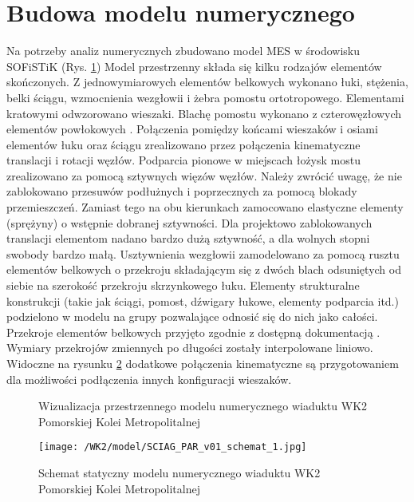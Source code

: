 \section{Budowa modelu numerycznego} \label{sect:wk2_basic_num_model}

Na potrzeby analiz numerycznych zbudowano model MES w środowisku SOFiSTiK (Rys. \ref{fig: model_wk2_visualization}) Model przestrzenny składa się kilku rodzajów elementów skończonych. Z jednowymiarowych elementów belkowych wykonano łuki, stężenia, belki ściągu, wzmocnienia wezgłowii i żebra pomostu ortotropowego. Elementami kratowymi odwzorowano wieszaki. Blachę pomostu wykonano z czterowęzłowych elementów powłokowych \parencite{SOFiSTiK2018}. Połączenia pomiędzy końcami wieszaków i osiami elementów łuku oraz ściągu zrealizowano przez połączenia kinematyczne translacji i rotacji węzłów. Podparcia pionowe w miejscach łożysk mostu zrealizowano za pomocą sztywnych więzów węzłów. Należy zwrócić uwagę, że nie zablokowano przesuwów podłużnych i poprzecznych za pomocą blokady przemieszczeń. Zamiast tego na obu kierunkach zamocowano elastyczne elementy (sprężyny) o wstępnie dobranej sztywności. Dla projektowo zablokowanych translacji elementom nadano bardzo dużą sztywność, a dla wolnych stopni swobody bardzo małą. Usztywnienia wezgłowii zamodelowano za pomocą rusztu elementów belkowych o przekroju składającym się z dwóch blach odsuniętych od siebie na szerokość przekroju skrzynkowego łuku. Elementy strukturalne konstrukcji (takie jak ściągi, pomost, dźwigary łukowe, elementy podparcia itd.) podzielono w modelu na grupy pozwalające odnosić się do nich jako całości. Przekroje elementów belkowych przyjęto zgodnie z dostępną dokumentacją \parencite{SOFiSTiK2018}. Wymiary przekrojów zmiennych po długości zostały interpolowane liniowo. Widoczne na rysunku \ref{fig: model_wk2_static_scheme} dodatkowe połączenia kinematyczne są przygotowaniem dla możliwości podłączenia innych konfiguracji wieszaków.



\begin{figure}[hbt!]
	\centering
	\captionsetup{justification=centering}
	\caption{Wizualizacja przestrzennego modelu numerycznego wiaduktu WK2 Pomorskiej Kolei Metropolitalnej}
	\label{fig: model_wk2_visualization}
	
\end{figure}
\begin{figure}[hbt!]
	\centering
	\texttt{[image: /WK2/model/SCIAG\_PAR\_v01\_schemat\_1.jpg]}
	\captionsetup{justification=centering}
	\caption{Schemat statyczny modelu numerycznego wiaduktu WK2 Pomorskiej Kolei Metropolitalnej}
	\label{fig: model_wk2_static_scheme}
\end{figure}


